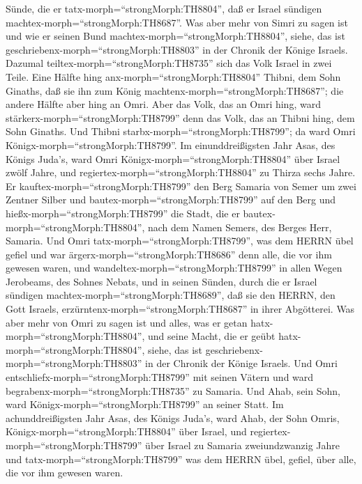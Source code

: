 Sünde, die er tatx-morph=``strongMorph:TH8804'', daß er Israel sündigen
machtex-morph=``strongMorph:TH8687''.  Was aber mehr von
Simri zu sagen ist und wie er seinen Bund
machtex-morph=``strongMorph:TH8804'', siehe, das ist
geschriebenx-morph=``strongMorph:TH8803'' in der Chronik der Könige
Israels.  Dazumal teiltex-morph=``strongMorph:TH8735'' sich
das Volk Israel in zwei Teile. Eine Hälfte hing
anx-morph=``strongMorph:TH8804'' Thibni, dem Sohn Ginaths, daß sie ihn
zum König machtenx-morph=``strongMorph:TH8687''; die andere Hälfte aber
hing an Omri.  Aber das Volk, das an Omri hing, ward
stärkerx-morph=``strongMorph:TH8799'' denn das Volk, das an Thibni hing,
dem Sohn Ginaths. Und Thibni starbx-morph=``strongMorph:TH8799''; da
ward Omri Königx-morph=``strongMorph:TH8799''.  Im
einunddreißigsten Jahr Asas, des Königs Juda's, ward Omri
Königx-morph=``strongMorph:TH8804'' über Israel zwölf Jahre, und
regiertex-morph=``strongMorph:TH8804'' zu Thirza sechs Jahre.
 Er kauftex-morph=``strongMorph:TH8799'' den Berg Samaria
von Semer um zwei Zentner Silber und bautex-morph=``strongMorph:TH8799''
auf den Berg und hießx-morph=``strongMorph:TH8799'' die Stadt, die er
bautex-morph=``strongMorph:TH8804'', nach dem Namen Semers, des Berges
Herr, Samaria.  Und Omri tatx-morph=``strongMorph:TH8799'',
was dem HERRN übel gefiel und war ärgerx-morph=``strongMorph:TH8686''
denn alle, die vor ihm gewesen waren,  und
wandeltex-morph=``strongMorph:TH8799'' in allen Wegen Jerobeams, des
Sohnes Nebats, und in seinen Sünden, durch die er Israel sündigen
machtex-morph=``strongMorph:TH8689'', daß sie den HERRN, den Gott
Israels, erzürntenx-morph=``strongMorph:TH8687'' in ihrer Abgötterei.
 Was aber mehr von Omri zu sagen ist und alles, was er
getan hatx-morph=``strongMorph:TH8804'', und seine Macht, die er geübt
hatx-morph=``strongMorph:TH8804'', siehe, das ist
geschriebenx-morph=``strongMorph:TH8803'' in der Chronik der Könige
Israels.  Und Omri entschliefx-morph=``strongMorph:TH8799''
mit seinen Vätern und ward begrabenx-morph=``strongMorph:TH8735'' zu
Samaria. Und Ahab, sein Sohn, ward Königx-morph=``strongMorph:TH8799''
an seiner Statt.  Im achunddreißigsten Jahr Asas, des
Königs Juda's, ward Ahab, der Sohn Omris,
Königx-morph=``strongMorph:TH8804'' über Israel, und
regiertex-morph=``strongMorph:TH8799'' über Israel zu Samaria
zweiundzwanzig Jahre  und tatx-morph=``strongMorph:TH8799''
was dem HERRN übel, gefiel, über alle, die vor ihm gewesen waren.
